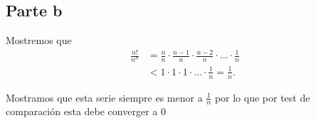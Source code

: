 \documentclass{report}
\begin{document}
\subsection{Parte b}
Mostremos que 
\begin{align*}
  \frac{n!}{n^{n}} &= \frac{n}{n}\cdot \frac{n - 1}{n} \cdot \frac{n - 2}{n} \cdot \ldots \cdot \frac{1}{n} \\
		   &< 1 \cdot 1 \cdot 1 \cdot \ldots \cdot \frac{1}{n} = \frac{1}{n}
.\end{align*}

Mostramos que esta serie siempre es menor a $\frac{1}{n}$ por lo que por test de comparación esta debe converger a $0$
\end{document}

